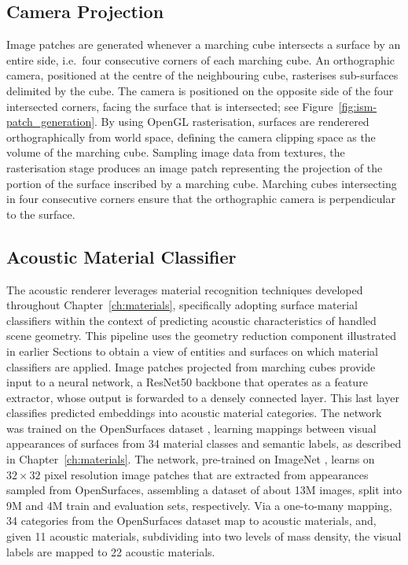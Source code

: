 \subsection{Camera Projection}
Image patches are generated whenever a marching cube intersects a surface by an entire side, i.e.\ four consecutive corners of each marching cube. An orthographic camera, positioned at the centre of the neighbouring cube, rasterises sub-surfaces delimited by the cube. The camera is positioned on the opposite side of the four intersected corners, facing the surface that is intersected; see Figure~\ref{fig:ism-patch_generation}. 
By using OpenGL rasterisation, surfaces are renderered orthographically from world space, defining the camera clipping space as the volume of the marching cube. Sampling image data from textures, the rasterisation stage produces an image patch representing the projection of the portion of the surface inscribed by a marching cube. Marching cubes intersecting in four consecutive corners ensure that the orthographic camera is perpendicular to the surface.\par

\subsection{Acoustic Material Classifier}
The acoustic renderer leverages material recognition techniques developed throughout Chapter~\ref{ch:materials}, specifically adopting surface material classifiers within the context of predicting acoustic characteristics of handled scene geometry. This pipeline uses the geometry reduction component illustrated in earlier Sections to obtain a view of entities and surfaces on which material classifiers are applied.
Image patches projected from marching cubes provide input to a neural network, a ResNet50 \citep{he2016deep} backbone that operates as a feature extractor, whose output is forwarded to a densely connected layer. This last layer classifies predicted embeddings into acoustic material categories. The network was trained on the OpenSurfaces dataset \citep{bell2013opensurfaces}, learning mappings between visual appearances of surfaces from 34 material classes and semantic labels, as described in Chapter~\ref{ch:materials}. The network, pre-trained on ImageNet \citep{deng2009imagenet}, learns on $32\times32$ pixel resolution image patches that are extracted from appearances sampled from OpenSurfaces, assembling a dataset of about 13M images, split into 9M and 4M train and evaluation sets, respectively. Via a one-to-many mapping, 34 categories from the OpenSurfaces dataset map to acoustic materials, and, given 11 acoustic materials, subdividing into two levels of mass density, the visual labels are mapped to 22 acoustic materials.\par

